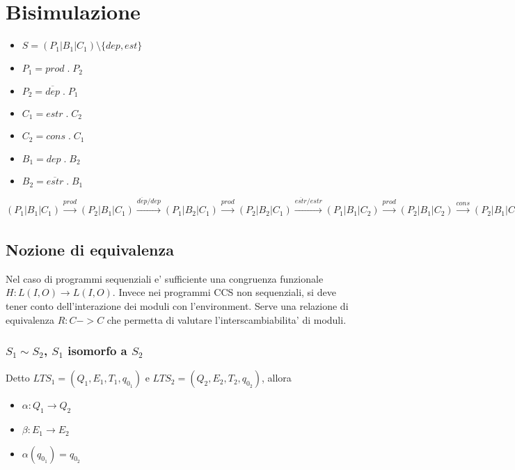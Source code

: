 \chapter{Bisimulazione}

\begin{itemize}
  \item $S = (P_1 | B_1 | C_1) \setminus \{dep, est\}$
  \item $P_1 = prod \; . \; P_2$
  \item $P_2 = \overline {dep} \; . \; P_1$
  \item $C_1 = estr \; . \; C_2$
  \item $C_2 = cons \; . \; C_1$
  \item $B_1 = dep \; . \; B_2$
  \item $B_2 = \overline {estr} \; . \; B_1$
\end{itemize}

$
(P_1 | B_1 | C_1)
\xrightarrow[]{prod} (P_2 | B_1 | C_1)
\xrightarrow[]{\overline {dep} / dep} (P_1 | B_2 | C_1)
\xrightarrow[]{prod} (P_2 | B_2 | C_1)
\xrightarrow[]{\overline {estr} / estr} (P_1 | B_1 | C_2)
\xrightarrow[]{prod} (P_2 | B_1 | C_2)
\xrightarrow[]{cons} (P_2 | B_1 | C_1)
$

\section{Nozione di equivalenza}

Nel caso di programmi sequenziali e' sufficiente una congruenza funzionale $H: L(I, O) \rightarrow L(I, O)$.
Invece nei programmi CCS non sequenziali, si deve tener conto dell'interazione dei moduli con l'environment.
Serve una relazione di equivalenza $R : C -> C$ che permetta di valutare l'interscambiabilita' di moduli.

\subsection{$S_1 \sim S_2$, $S_1$ isomorfo a $S_2$}

Detto ${LTS}_1 = (Q_1, E_1, T_1, q_{0_1})$ e ${LTS}_2 = (Q_2, E_2, T_2, q_{0_2})$, allora

\begin{itemize}
  \item $\alpha : Q_1 \rightarrow Q_2$
  \item $\beta : E_1 \rightarrow E_2$
  \item $\alpha(q_{0_1}) = q_{0_2}$
\end{itemize}

